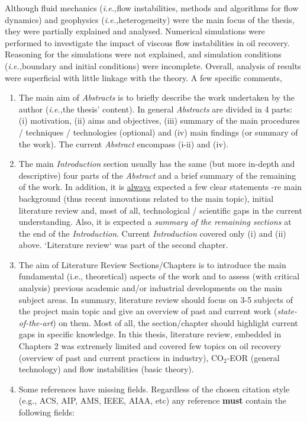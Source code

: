 \documentclass[14pt,twoside]{report}
\newcommand{\ie}{{\it i.e.,}}
\begin{document}
Although fluid mechanics (\ie flow instabilities, methods and algorithms for flow dynamics) and geophysics (\ie heterogeneity) were the main focus of the thesis, they were partially explained and analysed. Numerical simulations were performed to investigate the impact of viscous flow instabilities in oil recovery. Reasoning for the simulations were not explained, and simulation conditions (\ie boundary and initial conditions) were incomplete. Overall, analysis of results were superficial with little linkage with the theory. A few specific comments,
\begin{enumerate}
%
\item The main aim of {\it Abstracts} is to briefly describe the work undertaken by the author (\ie the thesis' content). In general {\it Abstracts} are divided in 4 parts: (i) motivation, (ii) aims and objectives, (iii) summary of the main procedures / techniques / technologies (optional) and (iv) main findings (or summary of the work). The current {\it Abstract} encompass (i-ii) and (iv).
%
\item The main {\it Introduction} section usually has the same (but more in-depth and descriptive) four parts of the {\it Abstract} and a brief summary of the remaining of the work. In addition, it is \underline{always} expected a few clear statements -re main background (thus recent innovations related to the main topic), initial literature review and, most of all, technological / scientific gaps in the current understanding. Also, it is expected a {\it summary of the remaining sections} at the end of the {\it Introduction}.  Current {\it Introduction} covered only (i) and (ii) above. `Literature review` was part of the second chapter.
%
\item The aim of Literature Review Sections/Chapters is to introduce the main fundamental (i.e., theoretical) aspects of the work and to assess (with critical analysis) previous academic and/or industrial developments on the main subject areas. In summary, literature review should focus on 3-5 subjects of the project main topic and give an overview of past and current work ({\it state-of-the-art}) on them. Most of all, the section/chapter should highlight current gaps in specific knowledge. In this thesis, literature review, embedded in Chapters 2 was extremely limited and covered few topics on oil recovery (overview of past and current practices in industry), CO$_{2}$-EOR (general technology) and flow instabilities (basic theory).
%
\item Some references have missing fields. Regardless of the chosen citation style (e.g., ACS, AIP, AMS, IEEE, AIAA, etc) any reference {\bf must} contain the following fields: 

\end{enumerate}
\end{document}
